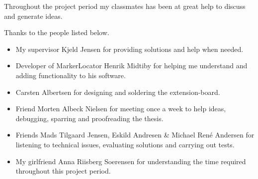 Throughout the project period my classmates has been at great help to discuss and generate ideas.

Thanks to the people listed below.
\begin{itemize}
	\item My supervisor Kjeld Jensen for providing solutions and help when needed.
	\item Developer of MarkerLocator Henrik Midtiby for helping me understand and adding functionality to his software.
	\item Carsten Albertsen for designing and soldering the extension-board.
	\item Friend Morten Albeck Nielsen for meeting once a week to help ideas, debugging, sparring and proofreading the thesis.
	\item Friends Mads Tilgaard Jensen, Eskild Andresen \& Michael René Andersen for listening to technical issues, evaluating solutions and carrying out tests.
	\item My girlfriend Anna Riisberg Soerensen for understanding the time required throughout this project period.
\end{itemize}
